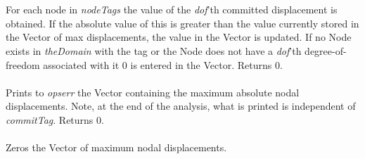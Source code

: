   \\
\\
For each node in {\em nodeTags} the value of the {\em dof}'th committed
displacement is obtained. If the absolute value of this is greater
than the value currently stored in the Vector of max displacements,
the value in the Vector is updated. If no Node exists in {\em
theDomain} with the tag or the Node does not have a {\em dof}'th
degree-of-freedom associated with it $0$ is entered in the
Vector. Returns $0$. \\

\\
Prints to {\em opserr} the Vector containing the maximum absolute nodal
displacements. Note, at the end of the analysis, what is printed is
independent of {\em commitTag}. Returns $0$. \\

\\ 
Zeros the Vector of maximum nodal displacements.